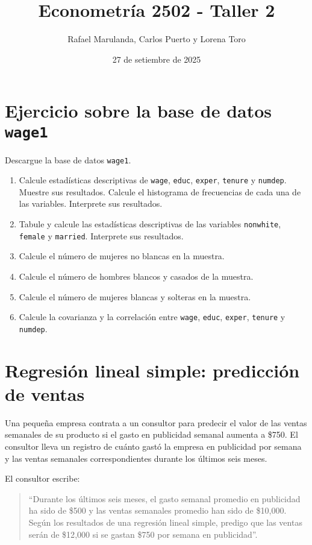 \documentclass[12pt]{article}
\title{Econometría 2502 - Taller 2}
\author{Rafael Marulanda, Carlos Puerto y Lorena Toro}
\date{27 de setiembre de 2025}
\begin{document}
\maketitle

\section{Ejercicio sobre la base de datos \texttt{wage1}}

Descargue la base de datos \texttt{wage1}.

\begin{enumerate}[label=\alph*)]
    \item Calcule estadísticas descriptivas de \texttt{wage}, \texttt{educ}, \texttt{exper}, \texttt{tenure} y \texttt{numdep}. Muestre sus resultados. Calcule el histograma de frecuencias de cada una de las variables. Interprete sus resultados.
    
    \item Tabule y calcule las estadísticas descriptivas de las variables \texttt{nonwhite}, \texttt{female} y \texttt{married}. Interprete sus resultados.
    
    \item Calcule el número de mujeres no blancas en la muestra.
    
    \item Calcule el número de hombres blancos y casados de la muestra.
    
    \item Calcule el número de mujeres blancas y solteras en la muestra.
    
    \item Calcule la covarianza y la correlación entre \texttt{wage}, \texttt{educ}, \texttt{exper}, \texttt{tenure} y \texttt{numdep}.
\end{enumerate}

\section{Regresión lineal simple: predicción de ventas}

Una pequeña empresa contrata a un consultor para predecir el valor de las ventas semanales de su producto si el gasto en publicidad semanal aumenta a \$750. 
El consultor lleva un registro de cuánto gastó la empresa en publicidad por semana y las ventas semanales correspondientes durante los últimos seis meses. 

El consultor escribe: 
\begin{quote}
``Durante los últimos seis meses, el gasto semanal promedio en publicidad ha sido de \$500 y las ventas semanales promedio han sido de \$10{,}000. 
Según los resultados de una regresión lineal simple, predigo que las ventas serán de \$12{,}000 si se gastan \$750 por semana en publicidad''.
\end{quote}
\end{document}
